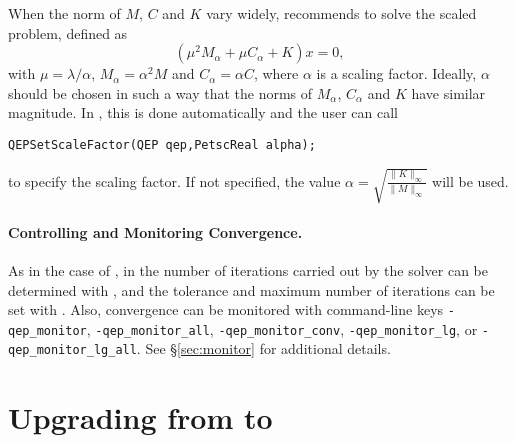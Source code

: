 When the norm of $M$, $C$ and $K$ vary widely, \cite{Tisseur:2000:BEC} recommends to solve the scaled problem, defined as 
\begin{equation}
(\mu^2M_\alpha+\mu C_\alpha+K)x=0,\label{eq:scaled}
\end{equation}
with $\mu=\lambda/\alpha$, $M_\alpha=\alpha^2M$ and $C_\alpha=\alpha C$, where $\alpha$ is a scaling factor. Ideally, $\alpha$ should be chosen in such a way that the norms of $M_\alpha$, $C_\alpha$ and $K$ have similar magnitude. In \slepc, this is done automatically and the user can call
	\begin{Verbatim}[fontsize=\small]
	QEPSetScaleFactor(QEP qep,PetscReal alpha);
	\end{Verbatim}
to specify the scaling factor. If not specified, the value $\alpha=\sqrt{\frac{\|K\|_\infty}{\|M\|_\infty}}$ will be used.

\paragraph{Controlling and Monitoring Convergence.}

As in the case of , in  the number of iterations carried out by the solver can be determined with , and the tolerance and maximum number of iterations can be set with . Also, convergence can be monitored with command-line keys \Verb!-qep_monitor!, \Verb!-qep_monitor_all!, \Verb!-qep_monitor_conv!, \Verb!-qep_monitor_lg!, or \Verb!-qep_monitor_lg_all!. See \S\ref{sec:monitor} for additional details.

\section{\label{sec:qeppep}Upgrading from  to }

